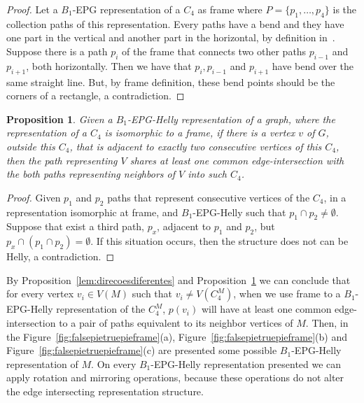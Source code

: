 \documentclass[a4paper,11pt]{article}
\newtheorem{prop}[theorem]{Proposition}
\begin{document}
\begin{proof}
Let a $B_1$-EPG representation of a $C_4$ as frame where $P = \{p_1, \dots, p_4\}$ is the collection paths of this representation.  Every paths have a bend and they have one part in the vertical and another part in the horizontal, by  definition in~\citep{golumbic2009}. Suppose there is a path $p_i$ of the frame that connects two other paths $p_{i-1} $ and $ p_{i + 1}$, both horizontally. Then we have that $p_i, p_{i-1}$ and $ p_{i + 1}$ have bend over the same straight line. But, by frame definition, these bend points should be the corners of a rectangle, a contradiction.
\end{proof}

\begin{prop}\label{lem:mesmaretasuporte}
Given a $B_1$-EPG-Helly representation of a graph, where the representation of a $C_4$ is isomorphic to a frame, if there is a vertex $v$ of $G$, outside this $C_4$, that is adjacent to exactly two consecutive vertices of this $C_4$, then the path representing $V$ shares at least one common edge-intersection with the both paths representing neighbors of $V$ into such $C_4$.  
\end{prop}

\begin{proof}
Given $p_1$ and $p_2$ paths that represent consecutive vertices of the $C_4$, in a representation isomorphic at frame, and $B_1$-EPG-Helly such that $p_1 \cap p_2 \neq \emptyset$.
Suppose that exist a third path, $p_x$, adjacent to $p_1$ and $p_2$, but $p_x \cap (p_1 \cap p_2) = \emptyset$. If this situation occurs, then the structure does not can be  Helly, a contradiction.
\end{proof}


By Proposition~\ref{lem:direcoesdiferentes} and Proposition~\ref{lem:mesmaretasuporte} we can conclude that for every vertex $v_i \in V(M)$ such that $v_i \neq V(C_4^M)$, when we use frame to a $B_{1}$-EPG-Helly representation of the $C_4^M$, $p(v_i)$ will have at least one common edge-intersection to a pair of paths equivalent to its neighbor vertices of $M$. Then, in the Figure~\ref{fig:falsepietruepieframe}(a), Figure~\ref{fig:falsepietruepieframe}(b) and Figure~\ref{fig:falsepietruepieframe}(c) are presented some possible $B_{1}$-EPG-Helly representation of $M$. On every $B_{1}$-EPG-Helly representation presented we can apply rotation and mirroring operations, because these operations do not alter the edge intersecting representation structure.
\end{document}
